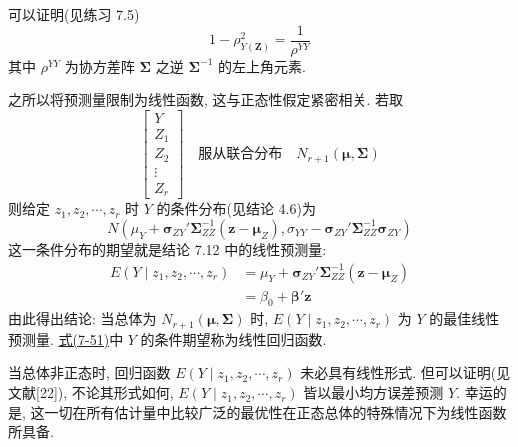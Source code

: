 
可以证明(见练习 7.5)
\label{eq:7-50}
\begin{equation}
1-\rho_{Y(\mathbf{Z})}^2=\frac{1}{\rho^{YY}}
\tag{7-50}
\end{equation}
其中 $\rho^{YY}$ 为协方差阵 $\boldsymbol{\Sigma}$ 之逆 $\boldsymbol{\Sigma}^{-1}$ 的左上角元素.

之所以将预测量限制为线性函数, 这与正态性假定紧密相关. 若取
\[
\left[\begin{array}{c}
Y\\
Z_1\\
Z_2\\
\vdots\\
Z_r
\end{array}\right]
\quad\text{服从联合分布}\quad N_{r+1}(\boldsymbol{\mu},\boldsymbol{\Sigma})
\]
则给定 $z_1,z_2,\cdots,z_r$ 时 $Y$ 的条件分布(见结论 4.6)为
\[
N\left(\mu_Y+\boldsymbol{\sigma}_{ZY}'\boldsymbol{\Sigma}_{ZZ}^{-1}(\mathbf{z}-\boldsymbol{\mu}_Z),
\sigma_{YY}-\boldsymbol{\sigma}_{ZY}'\boldsymbol{\Sigma}_{ZZ}^{-1}\boldsymbol{\sigma}_{ZY}\right)
\]
这一条件分布的期望就是结论 7.12 中的线性预测量:
\label{eq:7-51}
\begin{equation}
\begin{aligned}
E(Y\mid z_1,z_2,\cdots,z_r)&=\mu_Y+\boldsymbol{\sigma}_{ZY}'\boldsymbol{\Sigma}_{ZZ}^{-1}(\mathbf{z}-\boldsymbol{\mu}_Z)\\
&=\beta_0+\boldsymbol{\beta}'\mathbf{z}
\end{aligned}
\tag{7-51}
\end{equation}
由此得出结论: 当总体为 $N_{r+1}(\boldsymbol{\mu},\boldsymbol{\Sigma})$ 时, $E(Y\mid z_1,z_2,\cdots,z_r)$ 为 $Y$ 的最佳线性预测量. \hyperref[eq:7-51]{式(7-51)}中 $Y$ 的条件期望称为线性回归函数.

当总体非正态时, 回归函数 $E(Y\mid z_1,z_2,\cdots,z_r)$ 未必具有线性形式. 但可以证明(见文献[22]), 不论其形式如何, $E(Y\mid z_1,z_2,\cdots,z_r)$ 皆以最小均方误差预测 $Y$. 幸运的是, 这一切在所有估计量中比较广泛的最优性在正态总体的特殊情况下为线性函数所具备.

